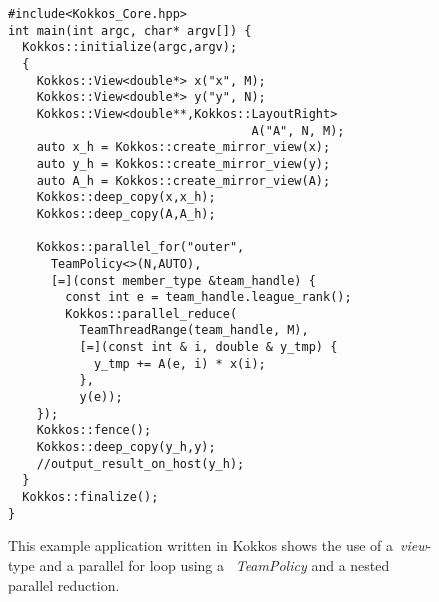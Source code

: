 \begin{figure}
\begin{small}
\begin{verbatim}
#include<Kokkos_Core.hpp>
int main(int argc, char* argv[]) {
  Kokkos::initialize(argc,argv);
  {
    Kokkos::View<double*> x("x", M);  
    Kokkos::View<double*> y("y", N);
    Kokkos::View<double**,Kokkos::LayoutRight> 
                                  A("A", N, M);  
    auto x_h = Kokkos::create_mirror_view(x);
    auto y_h = Kokkos::create_mirror_view(y);
    auto A_h = Kokkos::create_mirror_view(A);
    Kokkos::deep_copy(x,x_h);
    Kokkos::deep_copy(A,A_h);    

    Kokkos::parallel_for("outer", 
      TeamPolicy<>(N,AUTO),
      [=](const member_type &team_handle) {
        const int e = team_handle.league_rank();
        Kokkos::parallel_reduce( 
          TeamThreadRange(team_handle, M),
          [=](const int & i, double & y_tmp) {
            y_tmp += A(e, i) * x(i);
          }, 
          y(e));
    }); 
    Kokkos::fence();
    Kokkos::deep_copy(y_h,y);
    //output_result_on_host(y_h);
  }
  Kokkos::finalize();
}
\end{verbatim}
\end{small}
\caption{This example application written in Kokkos shows the use of a~\emph{view}-type and a parallel for loop using a ~\emph{TeamPolicy} and a nested parallel reduction. }
\label{fig:KokkosExample}
\end{figure}

